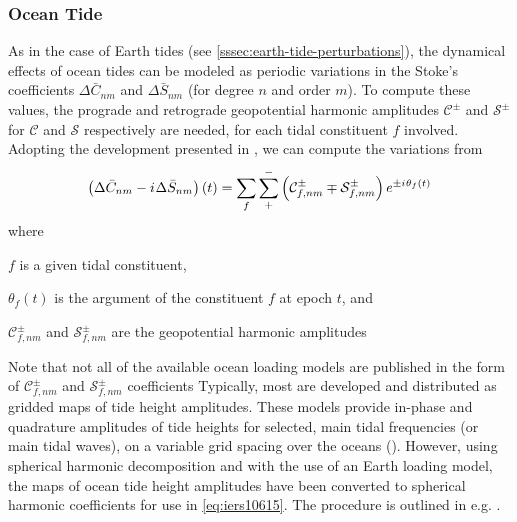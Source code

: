 \subsubsection{Ocean Tide}\label{sssec:ocean-tide-perturbations}

As in the case of Earth tides (see \autoref{sssec:earth-tide-perturbations}), the 
dynamical effects of ocean tides can be modeled as periodic variations in the 
Stoke's coefficients $\Delta \bar{C}_{nm}$ and $\Delta \bar{S}_{nm}$ (for 
degree $n$ and order $m$). To compute these values, the prograde and retrograde 
geopotential harmonic amplitudes $\mathcal{C}^{\pm}$ and $\mathcal{S}^{\pm}$ for 
$\mathcal{C}$ and $\mathcal{S}$ respectively are needed, for each tidal constituent 
$f$ involved. Adopting the development presented in \cite{iers2010}, we can compute 
the variations from
\begin{equation}
  \label{eq:iers10615}
  \left( \Delta \bar{C}_{nm} - {i\mkern1mu} \Delta \bar{S}_{nm} \right) (t) =
    \sum_{f} \sum_{+}^{-} \left( 
      \mathcal{C}_{f,nm}^{\pm} \mp \mathcal{S}_{f,nm}^{\pm} \right)
    e^{\pm {i\mkern1mu} \theta _f (t)}
\end{equation}
where
\begin{description}
  \item $f$ is a given tidal constituent,
  \item $\theta _f (t)$ is the argument of the constituent $f$ at epoch $t$, and
  \item $\mathcal{C}_{f,nm}^{\pm}$ and $\mathcal{S}_{f,nm}^{\pm}$ are the geopotential 
    harmonic amplitudes
\end{description}

Note that not all of the available ocean loading models are published in the form of 
$\mathcal{C}_{f,nm}^{\pm}$ and $\mathcal{S}_{f,nm}^{\pm}$ coefficients
Typically, most are developed and distributed as gridded maps of tide 
height amplitudes. These models provide in-phase and quadrature amplitudes of tide 
heights for selected, main tidal frequencies (or main tidal waves), on a variable 
grid spacing over the oceans (\cite{iers2010}). However, using spherical harmonic 
decomposition and with the use of an Earth loading model, the maps of ocean tide 
height amplitudes have been converted to spherical harmonic coefficients for use 
in \autoref{eq:iers10615}. The procedure is outlined in e.g. \cite{iers2010}.

